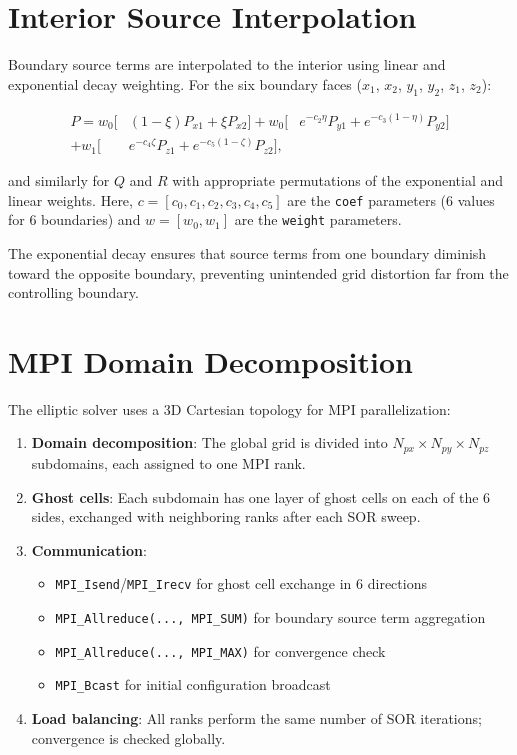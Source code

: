 \documentclass[11pt,a4paper]{report}
\begin{document}
\section{Interior Source Interpolation}

Boundary source terms are interpolated to the interior using linear and exponential decay weighting. For the six boundary faces ($x_1$, $x_2$, $y_1$, $y_2$, $z_1$, $z_2$):

\begin{equation}
\begin{split}
    P = w_0 \big[ &(1-\xi) P_{x1} + \xi P_{x2} \big]
      + w_0 \big[ &e^{-c_2 \eta} P_{y1} + e^{-c_3(1-\eta)} P_{y2} \big] \\
      + w_1 \big[ &e^{-c_4 \zeta} P_{z1} + e^{-c_5(1-\zeta)} P_{z2} \big],
\end{split}
\end{equation}

and similarly for $Q$ and $R$ with appropriate permutations of the exponential and linear weights. Here, $c = [c_0, c_1, c_2, c_3, c_4, c_5]$ are the \texttt{coef} parameters (6 values for 6 boundaries) and $w = [w_0, w_1]$ are the \texttt{weight} parameters.

The exponential decay ensures that source terms from one boundary diminish toward the opposite boundary, preventing unintended grid distortion far from the controlling boundary.

\section{MPI Domain Decomposition}

The elliptic solver uses a 3D Cartesian topology for MPI parallelization:

\begin{enumerate}
    \item \textbf{Domain decomposition}: The global grid is divided into $N_{px} \times N_{py} \times N_{pz}$ subdomains, each assigned to one MPI rank.
    \item \textbf{Ghost cells}: Each subdomain has one layer of ghost cells on each of the 6 sides, exchanged with neighboring ranks after each SOR sweep.
    \item \textbf{Communication}:
    \begin{itemize}
        \item \texttt{MPI\_Isend}/\texttt{MPI\_Irecv} for ghost cell exchange in 6 directions
        \item \texttt{MPI\_Allreduce(..., MPI\_SUM)} for boundary source term aggregation
        \item \texttt{MPI\_Allreduce(..., MPI\_MAX)} for convergence check
        \item \texttt{MPI\_Bcast} for initial configuration broadcast
    \end{itemize}
    \item \textbf{Load balancing}: All ranks perform the same number of SOR iterations; convergence is checked globally.
\end{enumerate}
\end{document}
